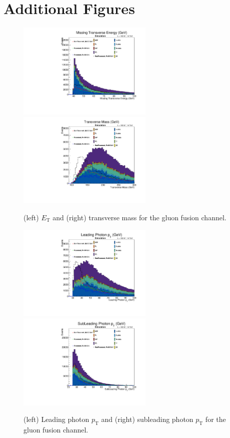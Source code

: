 \documentclass[11pt]{article}
\newcommand{\ET}{\ensuremath{E_{\mathrm{T}}}\xspace}
\newcommand{\pt}{\ensuremath{p_\mathrm{T}}\xspace}
\begin{document}
\clearpage
\section{Additional Figures}

\begin{figure}[htbp]
\centering
\includegraphics[height=1.8in]{figs/plots_ggh/MET.pdf}
\includegraphics[height=1.8in]{figs/plots_ggh/MT.pdf}
\caption{(left) \ET and (right) transverse mass for the gluon fusion channel.}
\label{fig:MET}
\end{figure}


\begin{figure}[htbp]
\centering
\includegraphics[height=1.8in]{figs/plots_ggh/leadingPhoton_pt.pdf}
\includegraphics[height=1.8in]{figs/plots_ggh/subleadingPhoton_pt.pdf}
\caption{(left) Leading photon \pt and (right) subleading photon \pt for the gluon fusion channel.}
\label{fig:leadingPhoton_pt}
\end{figure}
\end{document}
